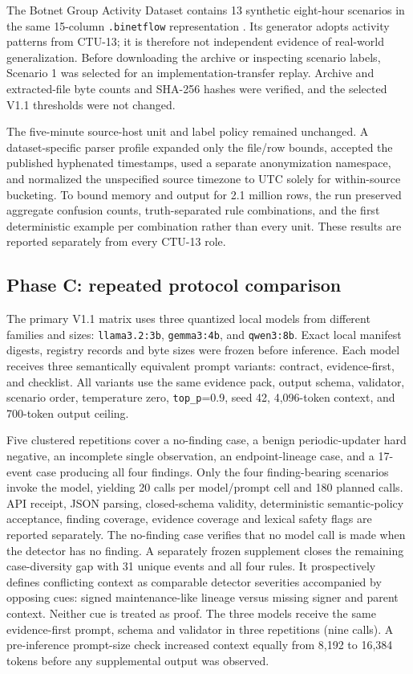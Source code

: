 \documentclass[11pt,a4paper,onecolumn]{IEEEtran}
\begin{document}
The Botnet Group Activity Dataset contains 13 synthetic eight-hour scenarios in the same 15-column \texttt{.binetflow} representation \cite{hostiadi2021botnetgroup,hostiadi2021botnetgroupdata}. Its generator adopts activity patterns from CTU-13; it is therefore not independent evidence of real-world generalization. Before downloading the archive or inspecting scenario labels, Scenario 1 was selected for an implementation-transfer replay. Archive and extracted-file byte counts and SHA-256 hashes were verified, and the selected V1.1 thresholds were not changed.

The five-minute source-host unit and label policy remained unchanged. A dataset-specific parser profile expanded only the file/row bounds, accepted the published hyphenated timestamps, used a separate anonymization namespace, and normalized the unspecified source timezone to UTC solely for within-source bucketing. To bound memory and output for 2.1 million rows, the run preserved aggregate confusion counts, truth-separated rule combinations, and the first deterministic example per combination rather than every unit. These results are reported separately from every CTU-13 role.

\subsection{Phase C: repeated protocol comparison}

The primary V1.1 matrix uses three quantized local models from different families and sizes: \texttt{llama3.2:3b}, \texttt{gemma3:4b}, and \texttt{qwen3:8b}. Exact local manifest digests, registry records and byte sizes were frozen before inference. Each model receives three semantically equivalent prompt variants: contract, evidence-first, and checklist. All variants use the same evidence pack, output schema, validator, scenario order, temperature zero, \texttt{top\_p}=0.9, seed 42, 4,096-token context, and 700-token output ceiling.

Five clustered repetitions cover a no-finding case, a benign periodic-updater hard negative, an incomplete single observation, an endpoint-lineage case, and a 17-event case producing all four findings. Only the four finding-bearing scenarios invoke the model, yielding 20 calls per model/prompt cell and 180 planned calls. API receipt, JSON parsing, closed-schema validity, deterministic semantic-policy acceptance, finding coverage, evidence coverage and lexical safety flags are reported separately. The no-finding case verifies that no model call is made when the detector has no finding. A separately frozen supplement closes the remaining case-diversity gap with 31 unique events and all four rules. It prospectively defines conflicting context as comparable detector severities accompanied by opposing cues: signed maintenance-like lineage versus missing signer and parent context. Neither cue is treated as proof. The three models receive the same evidence-first prompt, schema and validator in three repetitions (nine calls). A pre-inference prompt-size check increased context equally from 8,192 to 16,384 tokens before any supplemental output was observed.
\end{document}
